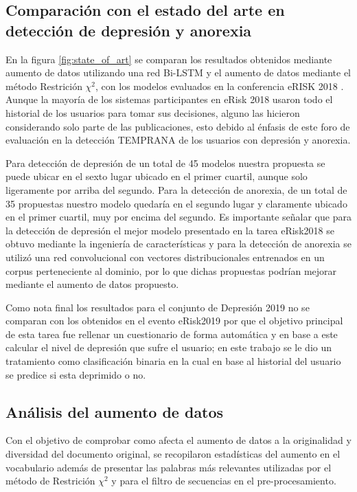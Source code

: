 \subsection{Comparación con el estado del arte en detección de depresión y anorexia}
En la figura \ref{fig:state_of_art} se comparan los resultados obtenidos mediante aumento de datos utilizando una red Bi-LSTM y el aumento de datos mediante el método Restrición $\chi^2$, con los modelos evaluados en la conferencia eRISK 2018 \citep{Losada2018}. Aunque la mayoría de los sistemas participantes en eRisk 2018 usaron todo el historial de los usuarios para tomar sus decisiones, alguno las hicieron considerando solo parte de las publicaciones, esto debido al énfasis de este foro de evaluación en la detección TEMPRANA de los usuarios con depresión y anorexia.

Para detección de depresión de un total de 45 modelos nuestra propuesta se puede ubicar en el sexto lugar ubicado en el primer cuartil, aunque solo ligeramente por arriba del segundo. Para la detección de anorexia, de un total de 35 propuestas nuestro modelo quedaría en el segundo lugar y claramente ubicado en el primer cuartil, muy por encima del segundo. Es importante señalar que para la detección de depresión el mejor modelo presentado en la tarea eRisk2018 se obtuvo mediante la ingeniería de características y para la detección de anorexia se utilizó una red convolucional con vectores distribucionales entrenados en un corpus perteneciente al dominio, por lo que dichas propuestas podrían mejorar mediante el aumento de datos propuesto. 



Como nota final los resultados para el conjunto de Depresión 2019 no se comparan con los obtenidos en el evento eRisk2019 por que el objetivo principal de esta tarea fue rellenar un cuestionario de forma automática y en base a este calcular el nivel de depresión que sufre el usuario; en este trabajo se le dio un tratamiento como clasificación binaria en la cual en base al historial del usuario se predice si esta deprimido o no.








\subsection{Análisis del aumento de datos}
Con el objetivo de comprobar como afecta el aumento de datos a la originalidad y diversidad del documento original, se recopilaron estadísticas del aumento en el vocabulario además de presentar las palabras más relevantes utilizadas por el método de Restrición $\chi^2$ y para el filtro de secuencias en el pre-procesamiento.

